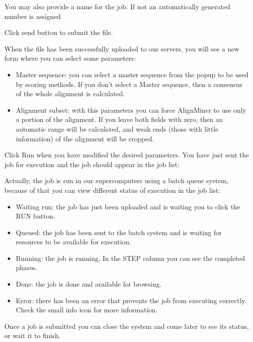 \documentclass[12pt,oneside,a4paper,english]{article}  %
\begin{document}
You may also provide a name for the job. If not an automatically generated number is assigned.

Click send button to submit the file.

		
When the file has been successfully uploaded to our servers, you will see a new form where you can select some parameters:

\begin{itemize}
\item Master sequence: you can select a master sequence from the popup to be used by scoring methods. If you don't select a Master sequence, then a consensus of the whole alignment is calculated.
\item Alignment subset: with this parameters you can force AlignMiner to use only a portion of the alignment. If you leave both fields with zero, then an automatic range will be calculated, and weak ends (those with little information) of the alignment will be cropped.
\end{itemize}

Click Run when you have modified the desired parameters. You have just sent the job for execution and the job should appear in the job list:



Actually, the job is run in our supercomputers using a batch queue system, because of that you can view different status of execution in the job list:

\begin{itemize}
\item Waiting run: the job has just been uploaded and is waiting you to click the RUN button.
\item Queued: the job has been sent to the batch system and is waiting for resources to be available for execution.
\item Running: the job is running. In the STEP column you can see the completed phases.
\item Done: the job is done and available for browsing.
\item Error: there has been an error that prevents the job from executing correctly. Check the small info icon for more information.
\end{itemize}

Once a job is submitted you can close the system and come later to see its status, or wait it to finish.
\end{document}
